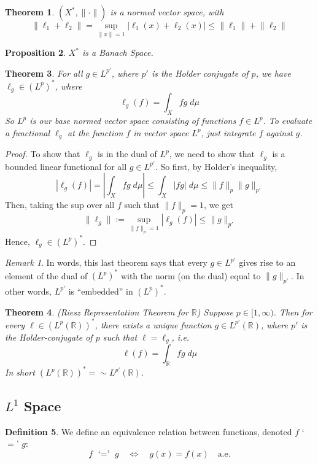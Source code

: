 \documentclass[12pt]{article}
\theoremstyle{plain}
\newtheorem{thm}{Theorem}[subsection]
\newtheorem{prop}[thm]{Proposition}
\theoremstyle{definition}
\newtheorem{defn}[thm]{Definition}
\theoremstyle{remark}
\newtheorem*{rmk}{Remark}
\begin{document}
\begin{thm}
$(X^*,\lVert \cdot\rVert)$ is a normed vector space, with 
\[
    \lVert \ell_1+\ell_2\rVert = \sup_{\lVert x\rVert=1}
    |\ell_1(x)+\ell_2(x)|\leq
    \lVert \ell_1\rVert+ \lVert \ell_2\rVert
\]
\end{thm}

\begin{prop}
$X^*$ is a Banach Space.
\end{prop}

\begin{thm}
For all $g\in L^{p'}$, where $p'$ is the Holder conjugate of $p$, we have $\ell_g\in(L^p)^*$, where 
\[
    \ell_g(f)=\int_X fg \; d\mu
\]
So $L^{p}$ is our base normed vector space consisting of functions $f\in L^p$. To evaluate a functional $\ell_g$ at the function $f$ in vector space $L^p$, just integrate $f$ against $g$.
\end{thm}
\begin{proof}
To show that $\ell_g$ is in the dual of $L^p$, we need to show that $\ell_g$ is a bounded linear functional for all $g\in L^{p'}$. So first, by Holder's inequality,
\[
    |\ell_g(f)| = 
    \left\lvert \int_X fg \; d\mu\right\rvert 
    \leq 
    \int_X \left\lvert fg \right\rvert \; d\mu
    \leq \lVert f\rVert_p \lVert g\rVert_{p'}
\]
Then, taking the sup over all $f$ such that $\lVert f\rVert_p=1$, we get
\[
    \lVert \ell_g\rVert :=
    \sup_{\lVert f\rVert_p=1}
    |\ell_g(f)| \leq \lVert g\rVert_{p'}
\]
Hence, $\ell_g\in (L^p)^*$. 
\end{proof}
\begin{rmk}
In words, this last theorem says that every $g\in L^{p'}$ gives rise to an element of the dual of $(L^p)^*$ with the norm (on the dual) equal to $\lVert g\rVert_{p'}$. In other words, $L^{p'}$ is ``embedded'' in $(L^p)^*$.
\end{rmk}

\begin{thm}
\emph{(Riesz Representation Theorem for $\mathbb{R}$)}
Suppose $p\in[1,\infty)$. Then for every $\ell\in(L^p(\mathbb{R}))^*$, there exists a unique function $g\in L^{p'}(\mathbb{R})$, where $p'$ is the Holder-conjugate of $p$ such that $\ell=\ell_g$, i.e.
\[
    \ell(f)=\int_\mathbb{R} fg \; d\mu
\]
In short $(L^p(\mathbb{R}))^* =\sim L^{p'}(\mathbb{R})$.
\end{thm}




\subsection{$L^1$ Space}
\begin{defn}
We define an equivalence relation between functions, denoted $f$ `$=$' $g$:
\[
    f \text{ `$=$' } g
    \quad \Leftrightarrow\quad 
    g(x) = f(x) \quad \text{a.e.}
\]
\end{defn}
\end{document}
